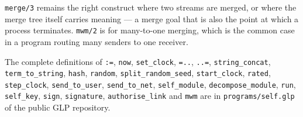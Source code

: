 \verb|merge/3| remains the right construct where two streams are merged, or where the merge tree itself carries meaning --- a merge goal that is also the point at which a process terminates. \verb|mwm/2| is for many-to-one merging, which is the common case in a program routing many senders to one receiver.

The complete definitions of \verb|:=|, \verb|now|, \verb|set_clock|, \verb|=..|, \verb|..=|, \verb|string_concat|, \verb|term_to_string|, \verb|hash|, \verb|random|, \verb|split_random_seed|, \verb|start_clock|, \verb|rated|, \verb|step_clock|, \verb|send_to_user|, \verb|send_to_net|, \verb|self_module|, \verb|decompose_module|, \verb|run|, \verb|self_key|, \verb|sign|, \verb|signature|, \verb|authorise_link| and \verb|mwm| are in \verb|programs/self.glp| of the public GLP repository.

